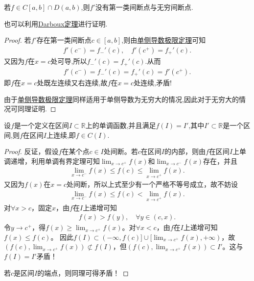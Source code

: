 \documentclass[../../main.tex]{subfiles}
\begin{document}
\begin{proposition}\label{proposition:导函数没有第一类间断点与无穷间断点}
若$f\in C[a,b]\cap D(a,b)$,则$f'$没有第一类间断点与无穷间断点.
\end{proposition}
\begin{remark}
也可以利用\hyperref[theorem:导数介值定理]{Darboux定理}进行证明.
\end{remark}
\begin{proof}
若$f'$存在第一类间断点$c\in [a,b]$,则由\hyperref[theorem:单侧导数极限定理]{单侧导数极限定理}可知
\begin{align*}
f' \left( c^- \right) =f_{-}'\left( c \right) ,\quad f' \left( c^+ \right) =f_{+}'\left( c \right) .
\end{align*}
又因为$f$在$x=c$处可导,所以$f_{-}'\left( c \right) =f_{+}'\left( c \right)$.从而\
\begin{align*}
f' \left( c^- \right) =f_{-}'\left( c \right) =f_{+}'\left( c \right) =f'\left( c^+ \right) .
\end{align*}
即$f$在$x=c$处既左连续又右连续,故$f$在$x=c$处连续,矛盾!

由于\hyperref[theorem:单侧导数极限定理]{单侧导数极限定理}同样适用于单侧导数为无穷大的情况,因此对于无穷大的情况可同理证明.

\end{proof}

\begin{proposition}\label{proposition:定义是区间的单调函数值域还是区间就必是连续函数}
设$f$是一个定义在区间$I\subset \mathbb{R}$上的单调函数,并且满足$f(I)=I'$,其中$I'\subset \mathbb{R}$是一个区间,则$f$在区间$I$上连续,即$f\in C(I)$.
\end{proposition}
\begin{proof}
反证，假设$f$在某个点$c\in I$处间断。若$c$在区间$I$的内部，则由$f$在区间$I$上单调递增，利用单调有界定理可知$\lim_{x\rightarrow c^+}f(x)$和$\lim_{x\rightarrow c^-}f(x)$存在，并且
\begin{align*}
\lim_{x\rightarrow c^-}f(x) \leqslant f(c) \leqslant \lim_{x\rightarrow c^+}f(x).
\end{align*}
又因为$f(x)$在$x=c$处间断，所以上式至少有一个严格不等号成立，故不妨设
\begin{align*}
\lim_{x\rightarrow c^-}f(x) \leqslant f(c) < \lim_{x\rightarrow c^+}f(x).
\end{align*}
对$\forall x>c$，固定$x$，由$f$在$I$上递增可知
\begin{align*}
f(x) > f(y), \quad \forall y \in (c, x).
\end{align*}
令$y\rightarrow c^+$，得$f(x) \geqslant \lim_{x\rightarrow c^+}f(x)$。对$\forall x<c$，由$f$在$I$上递增可知$f(x) \leqslant f(c)$。
因此$f(I) \subset (-\infty, f(c)] \cup [\lim_{x\rightarrow c^+}f(x), +\infty)$，故$(f(c), \lim_{x\rightarrow c^+}f(x)) \not\subset f(I)$，但$(f(c), \lim_{x\rightarrow c^+}f(x)) \subset I'$。这与$f(I) = I'$矛盾！

若$c$是区间$I$的端点，则同理可得矛盾！

\end{proof}
\end{document}
